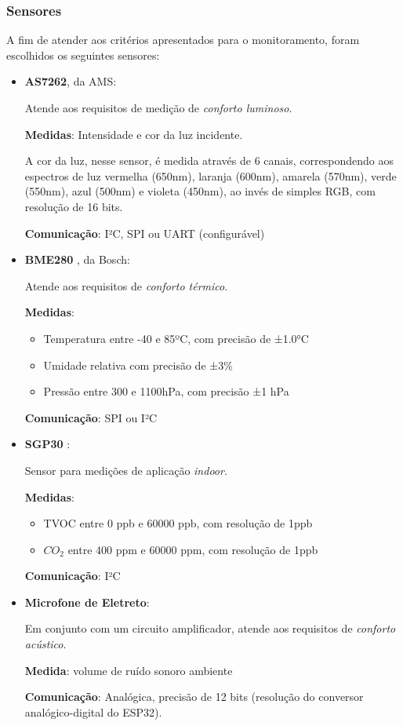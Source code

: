 \documentclass[../monografia.tex]{subfiles}
\begin{document}
\subsubsection{Sensores}
A fim de atender aos critérios apresentados para o monitoramento, foram escolhidos os seguintes sensores: 
\begin{itemize}
\item \textbf{AS7262}\cite{as7262}, da AMS: 

Atende aos requisitos de medição de \textit{conforto luminoso}. 

\textbf{Medidas}: Intensidade e cor da luz incidente.

A cor da luz, nesse sensor, é medida através de 6 canais, correspondendo aos espectros de luz vermelha (650nm), laranja (600nm), amarela (570nm), verde (550nm), azul (500nm) e violeta (450nm), ao invés de simples RGB, com resolução de 16 bits.

\textbf{Comunicação}: I²C, SPI ou UART (configurável)

\item \textbf{BME280} \cite{bme280}, da Bosch: 

Atende aos requisitos de \textit{conforto térmico}. 

\textbf{Medidas}: 
    \begin{itemize}
    \item Temperatura entre -40 e 85ºC, com precisão de ±1.0°C
    \item Umidade relativa com precisão de ±3\%
    \item Pressão entre 300 e 1100hPa, com precisão ±1 hPa
    \end{itemize}

\textbf{Comunicação}: SPI ou I²C

\item \textbf{SGP30} \cite{sgp30}:

Sensor para medições de aplicação \textit{indoor}. 

\textbf{Medidas}:
    \begin{itemize}
    \item TVOC entre 0 ppb e 60000 ppb, com resolução de 1ppb
    \item $CO_{2}$ entre 400 ppm e 60000 ppm, com resolução de 1ppb
    \end{itemize}

\textbf{Comunicação}: I²C

\item \textbf{Microfone de Eletreto}:

Em conjunto com um circuito amplificador, atende aos requisitos de \textit{conforto acústico}. 

\textbf{Medida}: volume de ruído sonoro ambiente

\textbf{Comunicação}: Analógica, precisão de 12 bits (resolução do conversor analógico-digital do ESP32). 
\end{itemize}
\end{document}

